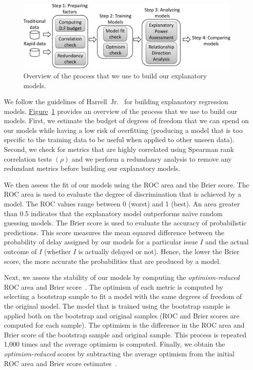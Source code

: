 \begin{figure}[t!]
	\centering
	\includegraphics[width=\columnwidth,keepaspectratio]
	{chapters/chapter5/figures/rq3/model_construction.pdf}
	\caption{Overview of the process that we use to build our explanatory models.}
	\label{fig:model_construction}
\end{figure}

We follow the guidelines of Harrell~Jr.~\cite{harrell2001regression} for
building explanatory regression models.
\hyperref[fig:model_construction]{Figure}~\ref{fig:model_construction} provides
an overview of the process that we use to build our models. First, we estimate
the budget of degrees of freedom that we can spend on our models while having a
low risk of overfitting (\ie producing a model that is too specific to the
training data to be useful when applied to other unseen data). Second, we check for
metrics that are highly correlated using Spearman rank correlation tests
$(\rho)$ and we perform a redundancy analysis to remove any redundant metrics
before building our explanatory models. 

We then assess the fit of our models using the ROC area and the Brier score. The
ROC area is used to evaluate the degree of discrimination that is achieved by
a model. The ROC values range between 0 (worst) and 1 (best). An area greater
than 0.5 indicates that the explanatory model outperforms na\"{i}ve random
guessing models. The Brier score is used to evaluate the accuracy of
probabilistic predictions. This score measures the mean squared difference
between the probability of delay assigned by our models for a particular issue
$I$ and the actual outcome of $I$ (\ie whether $I$ is actually delayed or not).
Hence, the lower the Brier score, the more accurate the probabilities that are
produced by a model.

Next, we assess the stability of our models by computing the
\textit{optimism-reduced} ROC area and Brier score~\cite{efron1986biased}. The
optimism of each metric is computed by selecting a bootstrap sample to
fit a model with the same degrees of freedom of the original model. The model
that is trained using the bootstrap sample is applied both on the bootstrap and original
samples (ROC and Brier scores are computed for each sample). The optimism is the
difference in the ROC area and Brier score of the bootstrap sample and original
sample. This process is repeated 1,000 times and the average optimism is
computed. Finally, we obtain the \textit{optimism-reduced} scores by subtracting
the average optimism from the initial ROC area and Brier score
estimates~\cite{efron1986biased}.

